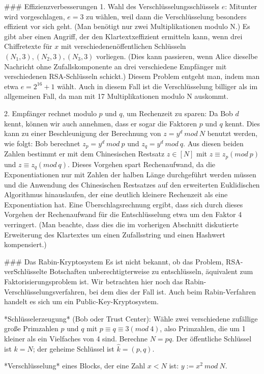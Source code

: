 \documentclass[a4paper]{article}
\begin{document}
\begin{multicols}{3}
{{{{### Effizienzverbesserungen
1. Wahl des Verschlüsselungsschlüssels $e$:
Mitunter wird vorgeschlagen, $e=3$ zu wählen, weil dann die Verschlüsselung besonders effizient vor sich geht. (Man benötigt nur zwei Multiplikationen modulo N.) Es gibt aber einen Angriff, der den Klartextxeffizient ermitteln kann, wenn drei Chiffretexte für $x$ mit verschiedenenöffentlichen Schlüsseln $(N_1,3),(N_2,3),(N_3,3)$ vorliegen. (Dies kann passieren, wenn Alice dieselbe Nachricht ohne Zufallskomponente an drei verschiedene Empfänger mit verschiedenen RSA-Schlüsseln schickt.)
Diesem Problem entgeht man, indem man etwa $e=2^{16}+1$ wählt. Auch in diesem Fall ist die Verschlüsselung billiger als im allgemeinen Fall, da man mit 17 Multiplikationen modulo N auskommt.

2. Empfänger rechnet modulo $p$ und $q$, um Rechenzeit zu sparen: Da Bob $d$ kennt, können wir auch annehmen, dass er sogar die Faktoren $p$ und $q$ kennt. Dies kann zu einer Beschleunigung der Berechnung von $z=y^d\ mod\ N$ benutzt werden, wie folgt: Bob berechnet $z_p=y^d\ mod\ p$ und $z_q=y^d\ mod\ q$. Aus diesen beiden Zahlen bestimmt er mit dem Chinesischen Restsatz $z\in [N]$ mit $z\equiv z_p (mod\ p)$ und $z\equiv z_q(mod\ q)$. Dieses Vorgehen spart Rechenaufwand, da die Exponentiationen nur mit Zahlen der halben Länge durchgeführt werden müssen und die Anwendung des Chinesischen Restsatzes auf den erweiterten Euklidischen Algorithmus hinauslaufen, der eine deutlich kleinere Rechenzeit als eine Exponentiation hat.
Eine Überschlagsrechnung ergibt, dass sich durch dieses Vorgehen der Rechenaufwand für die Entschlüsselung etwa um den Faktor 4 verringert. (Man beachte, dass dies die im vorherigen Abschnitt diskutierte Erweiterung des Klartextes um einen Zufallsstring und einen Hashwert kompensiert.)

### Das Rabin-Kryptosystem
Es ist nicht bekannt, ob das Problem, RSA-verSchlüsselte Botschaften unberechtigterweise zu entschlüsseln, äquivalent zum Faktorisierungsproblem ist. Wir betrachten hier noch das Rabin-Verschlüsselungsverfahren, bei dem dies der Fall ist. Auch beim Rabin-Verfahren handelt es sich um ein Public-Key-Kryptosystem. 

*Schlüsselerzeugung* (Bob oder Trust Center): Wähle zwei verschiedene zufällige große Primzahlen $p$ und $q$ mit $p\equiv q\equiv 3 (mod\ 4)$, also Primzahlen, die um 1 kleiner als ein Vielfaches von 4 sind. Berechne $N=pq$. Der öffentliche Schlüssel ist $k=N$; der geheime Schlüssel ist $\hat{k}= (p,q)$.

*Verschlüsselung* eines Blocks, der eine Zahl $x<N$ ist: $y:=x^2\ mod\ N$.

}}}}
\end{multicols}
\end{document}
